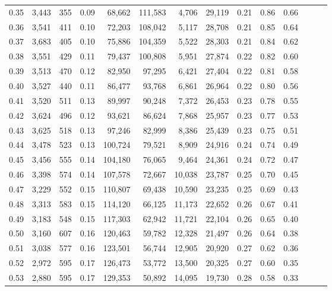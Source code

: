 \begin{tabular}{rrrrrrrrrrrrrr}
0.35 &  3,443 &  355 &  0.09 &   68,662 &  111,583 &   4,706 &  29,119 &  0.21 &  0.86 &      0.66 \\
0.36 &  3,541 &  411 &  0.10 &   72,203 &  108,042 &   5,117 &  28,708 &  0.21 &  0.85 &      0.64 \\
0.37 &  3,683 &  405 &  0.10 &   75,886 &  104,359 &   5,522 &  28,303 &  0.21 &  0.84 &      0.62 \\
0.38 &  3,551 &  429 &  0.11 &   79,437 &  100,808 &   5,951 &  27,874 &  0.22 &  0.82 &      0.60 \\
0.39 &  3,513 &  470 &  0.12 &   82,950 &   97,295 &   6,421 &  27,404 &  0.22 &  0.81 &      0.58 \\
0.40 &  3,527 &  440 &  0.11 &   86,477 &   93,768 &   6,861 &  26,964 &  0.22 &  0.80 &      0.56 \\
0.41 &  3,520 &  511 &  0.13 &   89,997 &   90,248 &   7,372 &  26,453 &  0.23 &  0.78 &      0.55 \\
0.42 &  3,624 &  496 &  0.12 &   93,621 &   86,624 &   7,868 &  25,957 &  0.23 &  0.77 &      0.53 \\
0.43 &  3,625 &  518 &  0.13 &   97,246 &   82,999 &   8,386 &  25,439 &  0.23 &  0.75 &      0.51 \\
0.44 &  3,478 &  523 &  0.13 &  100,724 &   79,521 &   8,909 &  24,916 &  0.24 &  0.74 &      0.49 \\
0.45 &  3,456 &  555 &  0.14 &  104,180 &   76,065 &   9,464 &  24,361 &  0.24 &  0.72 &      0.47 \\
0.46 &  3,398 &  574 &  0.14 &  107,578 &   72,667 &  10,038 &  23,787 &  0.25 &  0.70 &      0.45 \\
0.47 &  3,229 &  552 &  0.15 &  110,807 &   69,438 &  10,590 &  23,235 &  0.25 &  0.69 &      0.43 \\
0.48 &  3,313 &  583 &  0.15 &  114,120 &   66,125 &  11,173 &  22,652 &  0.26 &  0.67 &      0.41 \\
0.49 &  3,183 &  548 &  0.15 &  117,303 &   62,942 &  11,721 &  22,104 &  0.26 &  0.65 &      0.40 \\
0.50 &  3,160 &  607 &  0.16 &  120,463 &   59,782 &  12,328 &  21,497 &  0.26 &  0.64 &      0.38 \\
0.51 &  3,038 &  577 &  0.16 &  123,501 &   56,744 &  12,905 &  20,920 &  0.27 &  0.62 &      0.36 \\
0.52 &  2,972 &  595 &  0.17 &  126,473 &   53,772 &  13,500 &  20,325 &  0.27 &  0.60 &      0.35 \\
0.53 &  2,880 &  595 &  0.17 &  129,353 &   50,892 &  14,095 &  19,730 &  0.28 &  0.58 &      0.33 \\

\end{tabular}

